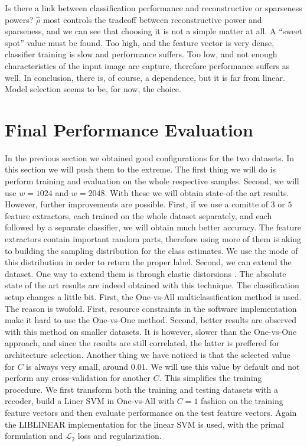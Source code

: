 \documentclass[12pt,a4paper,oneside,english]{UPBThesis}
\begin{document}
Is there a link between classification performance and reconstructive or sparseness powers? $\hat{\rho}$ most controls the tradeoff between reconstructive power and sparseness, and we can see that choosing it is not a simple matter at all. A ``sweet spot'' value must be found. Too high, and the feature vector is very dense, classifier training is slow and performance suffers. Too low, and not enough characteristics of the input image are capture, therefore performance suffers as well. In conclusion, there is, of course, a dependence, but it is far from linear. Model selection seems to be, for now, the choice.

\section{Final Performance Evaluation}
\label{sec:FinalPerformanceEvaluation}

In the previous section we obtained good configurations for the two datasets. In this section we will push them to the extreme. The first thing we will do is perform training and evaluation on the whole respective samples. Second, we will use $w=1024$ and $w=2048$. With these we will obtain state-of-the art results. However, further improvements are possible. First, if we use a comitte of $3$ or $5$ feature extractors, each trained on the whole dataset separately, and each followed by a separate classifier, we will obtain much better accuracy. The feature extractors contain important random parts, therefore using more of them is aking to building the sampling distribution for the class estimates. We use the mode of this distribution in order to return the proper label. Second, we can extend the dataset. One way to extend them is through elastic distorsions \cite{best-practices-cnn}. The absolute state of the art results are indeed obtained with this technique. The classification setup changes a little bit. First, the One-vs-All multiclassification method is used. The reason is twofold. First, resource constraints in the software implementation make it hard to use the One-vs-One method. Second, better results are observed with this method on smaller datasets. It is however, slower than the One-vs-One approach, and since the results are still correlated, the latter is preffered for architecture selection. Another thing we have noticed is that the selected value for $C$ is always very small, around $0.01$. We will use this value by default and not perform any cross-validation for another $C$. This simplifies the training procedure. We first transform both the training and testing datasets with a recoder, build a Liner SVM in One-vs-All with $C=1$ fashion on the training feature vectors and then evaluate performance on the test feature vectors. Again the LIBLINEAR implementation for the linear SVM is used, with the primal formulation and $\mathcal{L}_2$ loss and regularization.
\end{document}
